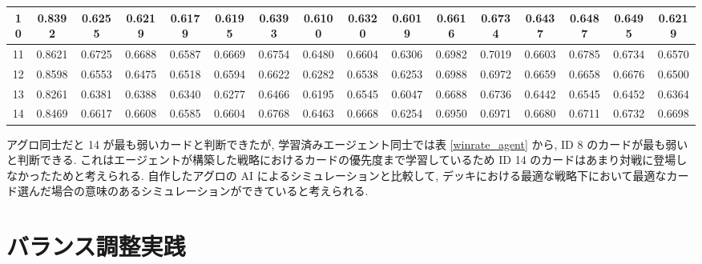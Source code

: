 \documentclass{jarticle}     %
\begin{document}
\begin{table}[ht]
{\begin{tabular}{|c|c|c|c|c|c|c|c|c|c|c|c|c|c|c|c|}
      \multicolumn{1}{|c|}{10} & 0.8392 & 0.6255 & 0.6219 & 0.6179 & 0.6195 & 0.6393 & 0.6100 & 0.6320 & 0.6019 & 0.6616 & 0.6734 & 0.6437 & 0.6487 & 0.6495 & 0.6219 \\ \hline
      \multicolumn{1}{|c|}{11} & 0.8621 & 0.6725 & 0.6688 & 0.6587 & 0.6669 & 0.6754 & 0.6480 & 0.6604 & 0.6306 & 0.6982 & 0.7019 & 0.6603 & 0.6785 & 0.6734 & 0.6570 \\ \hline
      \multicolumn{1}{|c|}{12} & 0.8598 & 0.6553 & 0.6475 & 0.6518 & 0.6594 & 0.6622 & 0.6282 & 0.6538 & 0.6253 & 0.6988 & 0.6972 & 0.6659 & 0.6658 & 0.6676 & 0.6500 \\ \hline
      \multicolumn{1}{|c|}{13} & 0.8261 & 0.6381 & 0.6388 & 0.6340 & 0.6277 & 0.6466 & 0.6195 & 0.6545 & 0.6047 & 0.6688 & 0.6736 & 0.6442 & 0.6545 & 0.6452 & 0.6364 \\ \hline
      \multicolumn{1}{|c|}{14} & 0.8469 & 0.6617 & 0.6608 & 0.6585 & 0.6604 & 0.6768 & 0.6463 & 0.6668 & 0.6254 & 0.6950 & 0.6971 & 0.6680 & 0.6711 & 0.6732 & 0.6698 \\ \hline
      \end{tabular}
  }
  
  \end{table}

アグロ同士だと 14 が最も弱いカードと判断できたが, 学習済みエージェント同士では表 \ref{winrate_agent} から, ID 8 のカードが最も弱いと判断できる.
これはエージェントが構築した戦略におけるカードの優先度まで学習しているため ID 14 のカードはあまり対戦に登場しなかったためと考えられる. 
自作したアグロの AI によるシミュレーションと比較して, デッキにおける最適な戦略下において最適なカード選んだ場合の意味のあるシミュレーションができていると考えられる.

\section{バランス調整実践}
\end{document}
